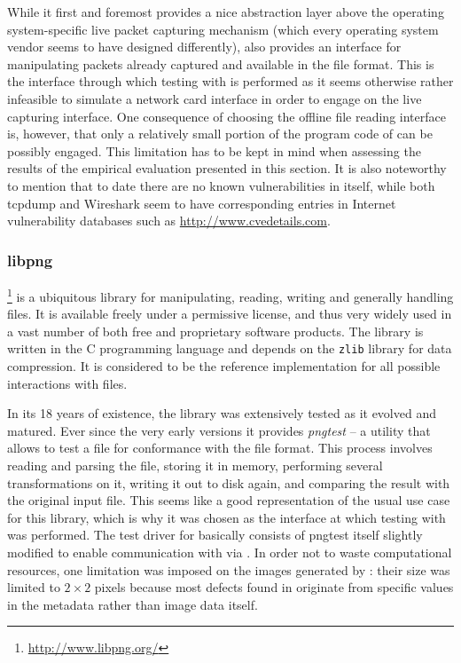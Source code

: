 While it first and foremost provides a nice abstraction layer above the operating system-specific live packet
capturing mechanism (which every operating system vendor seems to have designed differently), \libpcap
also provides an interface for manipulating packets already captured and available in the \pcap file format.
This is the interface through which testing with \xmlmate is performed as it seems otherwise rather
infeasible to simulate a network card interface in order to engage \libpng on the live capturing
interface. One consequence of choosing the offline file reading interface is, however, that only a relatively
small portion of the program code of \libpcap can be possibly engaged. This limitation has to be kept
in mind when assessing the results of the empirical evaluation presented in this section. It is also noteworthy
to mention that to date there are no known vulnerabilities in \libpcap itself, while both tcpdump and
Wireshark seem to have corresponding entries in Internet vulnerability databases such as
\url{http://www.cvedetails.com}.

\tocless\subsubsection{libpng}
\libpng\footnote{\url{http://www.libpng.org/}} is a ubiquitous library for manipulating, reading,
writing and generally handling \png files. It is available freely under a permissive license, and thus very
widely used in a vast number of both free and proprietary software products. The \libpng library is
written in the C programming language and depends on the \texttt{zlib} library for data compression.
It is considered to be the reference implementation for all possible interactions with \png files.

In its 18 years of existence, the library was extensively tested as it evolved and matured. Ever since the very
early versions it provides \emph{pngtest} -- a utility that allows to test a \png file for conformance with the
\png file format. This process involves reading and parsing the file, storing it in memory, performing several
transformations on it, writing it out to disk again, and comparing the result with the original input file.
This seems like a good representation of the usual use case for this library, which is why it was chosen as
the interface at which testing with \xmlmate was performed. The test driver for \libpng basically
consists of pngtest itself slightly modified to enable communication with \xmlmate via \zmq. In order not
to waste computational resources, one limitation was imposed on the images generated by \xmlmate: their size
was limited to $2\times 2$ pixels because most defects found in \libpng originate from specific values
in the metadata rather than image data itself.

